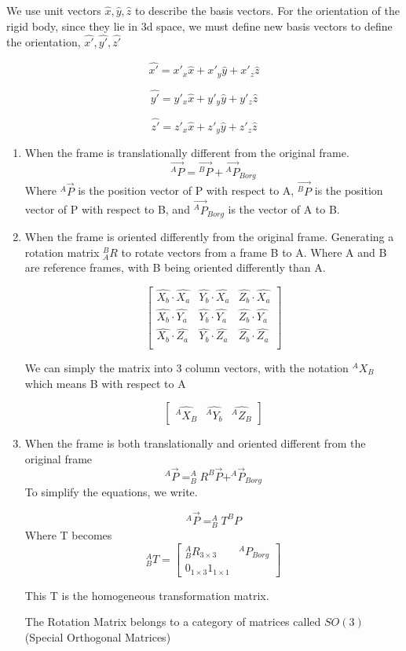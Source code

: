 \documentclass[11pt]{report}
\begin{document}
We use unit vectors \(\hat{x},\hat{y},\hat{z}\) to describe the basis vectors. For the orientation of the rigid body, since they lie in 3d space, we must define new basis vectors to define the orientation, \(\hat{x'}, \hat{y'}, \hat{z'}\)

$$
\hat{x'} = x'_x \hat{x} + x'_y\hat{y} + x'_z\hat{z}
$$

$$
\hat{y'} = y'_x \hat{x} + y'_y\hat{y} + y'_z\hat{z}
$$

$$
\hat{z'} = z'_x \hat{x} + z'_y\hat{y} + z'_z\hat{z}
$$
\begin{enumerate}
\item When the frame is translationally different from the original frame.
\label{sec:org8e7f84b}
$$
\vec{^AP} = \vec{^BP} + \vec{^AP}_{B org}
$$
Where \(^A\vec{P}\) is the position vector of P with respect to A, \(\vec{^BP}\) is the position vector of P with respect to B, and \(\vec{^AP}_{B org}\) is the vector of A to B.
\item When the frame is oriented differently from the original frame.
\label{sec:orge731b02}
Generating a rotation matrix \(^B_AR\) to rotate vectors from a frame B to A. Where A and B are reference frames, with B being oriented differently than A.

$$ \begin{bmatrix} \hat{X_b} \cdot \hat{X_a} & \hat{Y_b} \cdot \hat{X_a} & \hat{Z_b} \cdot \hat{X_a} \\ \hat{X_b} \cdot \hat{Y_a} & \hat{Y_b} \cdot \hat{Y_a} & \hat{Z_b} \cdot \hat{Y_a} \\ \hat{X_b} \cdot \hat{Z_a} & \hat{Y_b} \cdot \hat{Z_a} & \hat{Z_b} \cdot \hat{Z_a} \\ \end{bmatrix}$$

We can simply the matrix into 3 column vectors, with the notation \(^AX_B\) which means B with respect to A

$$\begin{bmatrix}\hat{^AX_B} & \hat{^AY_b} & \hat{^AZ_B}\end{bmatrix}$$
\item When the frame is both translationally and oriented different from the original frame
\label{sec:org39faf6b}
$$ ^A\vec{P} = ^A_B R ^B\vec{P} + ^A\vec{P}_{B org}$$
To simplify the equations, we write.

$$^A\vec{P} = _B^AT ^BP$$
Where T becomes
$$^A_BT = \begin{bmatrix}^A_BR_{3 \times 3} & ^AP_{B org} \\ 0_{1 \times 3} 1_{1 \times 1}\end{bmatrix}$$

This T is the homogeneous transformation matrix.

The Rotation Matrix belongs to a category of matrices called \(SO(3)\)(Special Orthogonal Matrices)
\end{enumerate}
\end{document}
